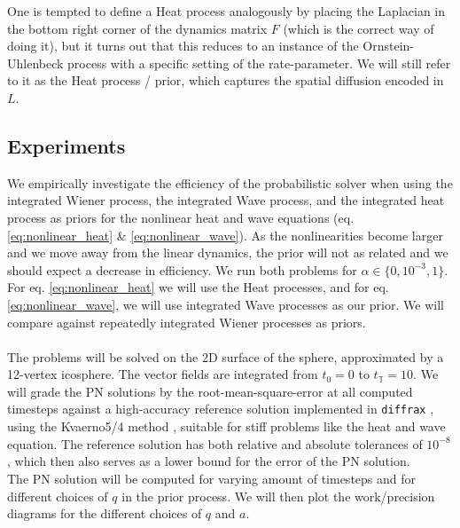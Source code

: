 \noindent
One is tempted to define a Heat process analogously by placing the Laplacian in the bottom right corner of the dynamics matrix $F$ (which is the correct way of doing it), but it turns out that this reduces to an instance of the Ornstein-Uhlenbeck process with a specific setting of the rate-parameter. We will still refer to it as the Heat process / prior, which captures the spatial diffusion encoded in $L$.

\subsection*{Experiments}
We empirically investigate the efficiency of the probabilistic solver when using the integrated Wiener process, the integrated Wave process, and the integrated heat process as priors for the nonlinear heat and wave equations (eq. \ref{eq:nonlinear_heat} \& \ref{eq:nonlinear_wave}).
As the nonlinearities become larger and we move away from the linear dynamics, the prior will not as related and we should expect a decrease in efficiency.  We run both problems for $\alpha\in\{0, 10^{-3}, 1\}$.
\\
For eq. \ref{eq:nonlinear_heat} we will use the Heat processes, and for eq. \ref{eq:nonlinear_wave}, we will use integrated Wave processes as our prior. We will compare against repeatedly integrated Wiener processes as priors.
\\\\
The problems will be solved on the 2D surface of the sphere, approximated by a 12-vertex icosphere. The vector fields are integrated from $t_0=0$ to $t_{\mathbb{T}}=10$.  We will grade the PN solutions by the root-mean-square-error at all computed timesteps against a high-accuracy reference solution implemented in \texttt{diffrax} \cite{diffrax}, using the Kvaerno5/4 method \cite{kvaerno}, suitable for stiff problems like the heat and wave equation. The reference solution has both relative and absolute tolerances of $10^{-8}$, which then also serves as a lower bound for the error of the PN solution.
\\ The PN solution will be computed for varying amount of timesteps and for different choices of $q$ in the prior process. We will then plot the work/precision diagrams for the different choices of $q$ and $a$.
